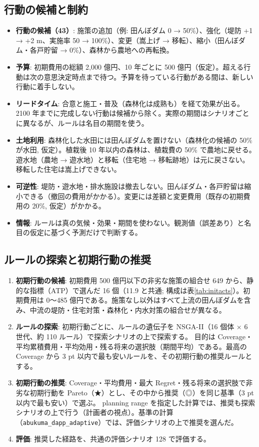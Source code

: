 \documentclass[a4paper,10pt]{ltjsarticle}
\begin{document}
\subsection{行動の候補と制約}
\begin{itemize}
  \item \textbf{行動の候補（43）}: 施策の追加（例: 田んぼダム 0 → 50\%）、強化（堤防 +1 → +2 m、実施率 50 → 100\%）、変更（嵩上げ → 移転）、縮小（田んぼダム・各戸貯留 → 0\%）、森林から農地への再転換。
  \item \textbf{予算}: 初期費用の総額 2,000 億円、10 年ごとに 500 億円（仮定）。超える行動は次の意思決定時点まで待つ。予算を待っている行動がある間は、新しい行動に着手しない。
  \item \textbf{リードタイム}: 合意と施工・普及（森林化は成熟も）を経て効果が出る。2100 年までに完成しない行動は候補から除く。実際の期間はシナリオごとに異なるが、ルールは名目の期間を使う。
  \item \textbf{土地利用}: 森林化した水田には田んぼダムを置けない（森林化の候補の 50\% が水田, 仮定）。植栽後 10 年以内の森林は、植栽費の 50\% で農地に戻せる。
    遊水地（農地 → 遊水地）と移転（住宅地 → 移転跡地）は元に戻さない。移転した住宅は嵩上げできない。
  \item \textbf{可逆性}: 堤防・遊水地・排水施設は撤去しない。田んぼダム・各戸貯留は縮小できる（撤回の費用がかかる）。変更には差額と変更費用（既存の初期費用の 20\%, 仮定）がかかる。
  \item \textbf{情報}: ルールは真の気候・効果・期間を使わない。観測値（誤差あり）と名目の仮定に基づく予測だけで判断する。
\end{itemize}

\subsection{ルールの探索と初期行動の推奨}
\begin{enumerate}
  \item \textbf{初期行動の候補}: 初期費用 500 億円以下の非劣な施策の組合せ 649 から、静的な指標（ATP）で選んだ 16 個（11.9 と共通; 構成は表\ref{tab:initacts}）。初期費用は 0〜485 億円である。施策なし以外はすべて上流の田んぼダムを含み、中流の堤防・住宅対策・森林化・内水対策の組合せが異なる。
  \item \textbf{ルールの探索}: 初期行動ごとに、ルールの遺伝子を NSGA-II\cite{deb2002}（16 個体 × 6 世代、約 110 ルール）で探索シナリオの上で探索する。
    目的は Coverage・平均累積費用・平均効用・残る将来の選択肢（期間平均）である。最高の Coverage から 3 pt 以内で最も安いルールを、その初期行動の推奨ルールとする。
  \item \textbf{初期行動の推奨}: Coverage・平均費用・最大 Regret・残る将来の選択肢で非劣な初期行動を Pareto（★）とし、その中から推奨（◎）を同じ基準（3 pt 以内で最も安い）で選ぶ。
    planning range を指定した計算では、推奨も探索シナリオの上で行う（計画者の視点）。基準の計算（\texttt{abukuma\_dapp\_adaptive}）では、評価シナリオの上で推奨を選んだ。
  \item \textbf{評価}: 推奨した経路を、共通の評価シナリオ 128 で評価する。
\end{enumerate}
\end{document}
